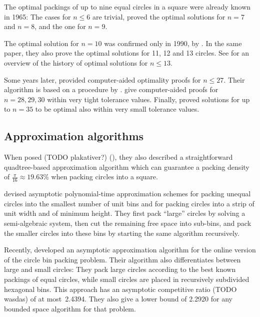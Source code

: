 \documentclass[a4paper,style=print,oneside,bibliography=totoc,nexus,lnum,extramargin]{tubsbook}
\begin{document}
The optimal packings of up to nine equal circles in a square were already known in 1965: The cases for $n \le 6$ are trivial,
\textcite{schaer1965densest} proved the optimal solutions for $n = 7$ and $n = 8$, and \textcite{SM1965geometric} the one for $n = 9$.

The optimal solution for $n = 10$ was confirmed only in 1990, by \textcite{DPW1990optimal}. In the same paper, they also prove the optimal solutions for 11, 12 and 13 circles.
See \textcite{WMP1994history} for an overview of the history of optimal solutions for $n \le 13$.

Some years later, \textcite{NO1998more} provided computer-aided optimality proofs for $n \le 27$. Their algorithm is based on a procedure by \textcite{PWMD1992packing}.
\textcite{MC2005new} give computer-aided proofs for $n=28,29,30$ within very tight tolerance values.
Finally, \textcite{LR2002packing} proved solutions for up to $n=35$ to be optimal also within very small tolerance values.

\subsection{Approximation algorithms}

When \textcite{DFL2010circle} posed (TODO plakativer?) (), they also described a straightforward quadtree-based approximation algorithm which can guarantee a packing density of $\frac{\pi}{16} \approx 19.63\%$ when packing circles into a square.

\textcite{MPSSW2014polynomial} devised asymptotic polynomial-time approximation schemes for packing unequal circles into the smallest number of unit bins and for packing circles into a strip of unit width and of minimum height. They first pack “large” circles by solving a semi-algebraic system, then cut the remaining free space into sub-bins, and pack the smaller circles into these bins by starting the same algorithm recursively.

Recently, \textcite{HMS2016bounded} developed an asymptotic approximation algorithm for the online version of the circle bin packing problem.
Their algorithm also differentiates between large and small circles: They pack large circles according to the best known packings of equal circles, while small circles are placed in recursively subdivided hexagonal bins. This approach has an asymptotic competitive ratio (TODO wasdas) of at most~2.4394. They also give a lower bound of 2.2920 for any bounded space algorithm for that problem.
\end{document}

